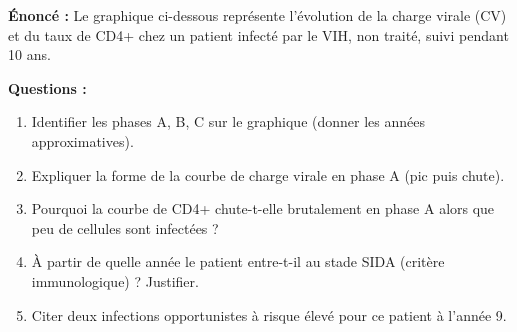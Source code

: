 \documentclass[11pt]{article}
\begin{document}
\begin{exoresolu}
\textbf{Énoncé :} Le graphique ci-dessous représente l'évolution de la charge virale (CV) et du taux de CD4+ chez un patient infecté par le VIH, non traité, suivi pendant 10 ans.
\begin{center}
\end{center}
\textbf{Questions :}
\begin{enumerate}
    \item Identifier les phases A, B, C sur le graphique (donner les années approximatives).
    \item Expliquer la forme de la courbe de charge virale en phase A (pic puis chute).
    \item Pourquoi la courbe de CD4+ chute-t-elle brutalement en phase A alors que peu de cellules sont infectées ?
    \item À partir de quelle année le patient entre-t-il au stade SIDA (critère immunologique) ? Justifier.
    \item Citer deux infections opportunistes à risque élevé pour ce patient à l'année 9.
\end{enumerate}


\end{exoresolu}
\end{document}
